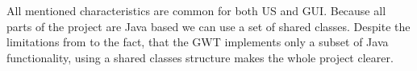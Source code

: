All mentioned characteristics are common for both US and GUI. Because all parts of the project are Java based we can use a set of shared classes. Despite the limitations from to the fact, that the GWT implements only a subset of Java functionality, using a shared classes structure makes the whole project clearer. 

